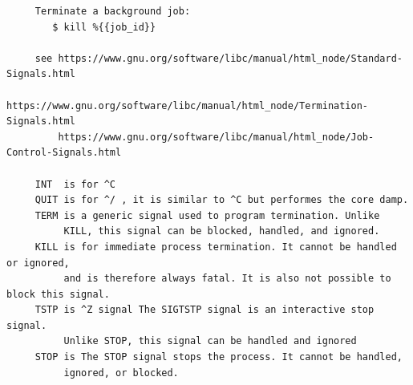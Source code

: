 \documentclass[a4paper,12pt]{article}
\begin{document}
\begin{verbatim}
     Terminate a background job:
        $ kill %{{job_id}}
    
     see https://www.gnu.org/software/libc/manual/html_node/Standard-Signals.html
         https://www.gnu.org/software/libc/manual/html_node/Termination-Signals.html
         https://www.gnu.org/software/libc/manual/html_node/Job-Control-Signals.html
     
     INT  is for ^C
     QUIT is for ^/ , it is similar to ^C but performes the core damp.
     TERM is a generic signal used to program termination. Unlike 
          KILL, this signal can be blocked, handled, and ignored.     
     KILL is for immediate process termination. It cannot be handled or ignored,
          and is therefore always fatal. It is also not possible to block this signal.
     TSTP is ^Z signal The SIGTSTP signal is an interactive stop signal.
          Unlike STOP, this signal can be handled and ignored
     STOP is The STOP signal stops the process. It cannot be handled, 
          ignored, or blocked.
      
\end{verbatim}
\end{document}
